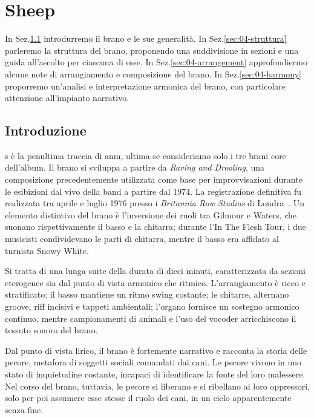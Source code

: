 \documentclass[class=book, crop=false, oneside, 12pt]{standalone}
\begin{document}
    \chapter{Sheep}
    \label{ch:04-sheep}

    In Sez.\ref{sec:04-intro} introdurremo il brano e le sue generalità. In Sez.\ref{sec:04-struttura} parleremo la struttura del brano, proponendo una suddivisione in sezioni e una guida all'ascolto per ciascuna di esse. In Sez.\ref{sec:04-arrangement} approfondiermo alcune note di arrangiamento e composizione  del brano. In Sez.\ref{sec:04-harmony} proporremo un'analisi e interpretazione armonica del brano, con particolare attenzione all'impianto narrativo.

    \section{Introduzione}
    \label{sec:04-intro}

    \acrlong{s} è la penultima traccia di \acrshort{anm}, ultima se consideriamo solo i tre brani core dell'album. 
    Il brano si sviluppa a partire da \emph{Raving and Drooling}, una composizione precedentemente utilizzata come base per improvvisazioni durante le esibizioni dal vivo della band a partire dal 1974. La registrazione definitiva fu realizzata tra aprile e luglio 1976 presso i \emph{Britannia Row Studios} di Londra~\cite{mabbett2010pink}. Un elemento distintivo del brano è l'inversione dei ruoli tra Gilmour e Waters, che suonano rispettivamente il basso e la chitarra; durante l'In The Flesh Tour, i due musicisti condividevano le parti di chitarra, mentre il basso era affidato al turnista Snowy White.

    Si tratta di una lunga suite della durata di dieci minuti, caratterizzata da sezioni eterogenee sia dal punto di vista armonico che ritmico. L'arrangiamento è ricco e stratificato: il basso 
    mantiene un ritmo swing costante; le chitarre, alternano groove, riff incisivi e tappeti ambientali; l'organo fornisce un sostegno armonico continuo, mentre campionamenti di animali e l'uso del vocoder arricchiscono il tessuto sonoro del brano.

    Dal punto di vista lirico, il brano è fortemente narrativo e racconta la storia delle pecore, metafora di soggetti sociali comandati dai cani. Le pecore vivono in uno stato di inquietudine costante, incapaci di identificare la fonte del loro malessere. Nel corso del brano, tuttavia, le pecore si liberano e si ribellano ai loro oppressori, solo per poi assumere esse stesse il ruolo dei cani, in un ciclo apparentemente senza fine.
\end{document}
